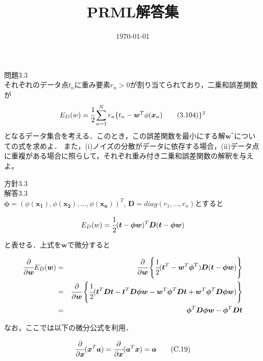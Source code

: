 \documentclass{jsarticle}
\title{PRML解答集}
\date{\today}
\begin{document}
\maketitle

問題3.3 \\
それぞれのデータ点$t_n$に重み要素$r_n > 0$が割り当てられており，二乗和誤差関数が
\begin{equation}
    E_D(w) = \cfrac{1}{2} \sum_{n=1}^{N}r_n \{t_n - \boldsymbol{w}^T \phi (\boldsymbol{x}_n) \tag{3.104} \}^2
\end{equation}
となるデータ集合を考える．このとき，この誤差関数を最小にする解$\boldsymbol{w}^{*}$についての式を求めよ．
また，(i)ノイズの分散がデータに依存する場合，(ii)データ点に重複がある場合に照らして，それぞれ重み付き二乗和誤差関数の解釈を与えよ。

方針3.3 \\

解答3.3 \\

$\boldsymbol{\phi} = (\phi(\boldsymbol{x_1}), \phi(\boldsymbol{x_2}), \ldots, \phi(\boldsymbol{x_n}))^T$, $\boldsymbol{D} = diag(r_1,\ldots,r_n)$とすると

$$ E_D(w) = \cfrac{1}{2} (\boldsymbol{t} - \boldsymbol{\phi}\boldsymbol{w})^T\boldsymbol{D}(\boldsymbol{t} - \boldsymbol{\phi}\boldsymbol{w}) $$

と表せる．上式を$\boldsymbol{w}$で微分すると

\begin{eqnarray*}
    \cfrac{\partial}{\partial \boldsymbol{w}} E_D(\boldsymbol{w})
    &=& \cfrac{\partial}{\partial \boldsymbol{w}} \left\{ \cfrac{1}{2} (\boldsymbol{t}^T - \boldsymbol{w}^T \boldsymbol{\phi}^T)\boldsymbol{D}
    (\boldsymbol{t} - \boldsymbol{\phi}\boldsymbol{w} )  \right\} \\
    &=& \cfrac{\partial}{\partial \boldsymbol{w}} \left\{ \cfrac{1}{2} ( \boldsymbol{t}^T \boldsymbol{D}\boldsymbol{t}
    - \boldsymbol{t}^T \boldsymbol{D} \boldsymbol{\phi} \boldsymbol{w}
    - \boldsymbol{w}^T \boldsymbol{\phi}^T \boldsymbol{D} \boldsymbol{t}
    + \boldsymbol{w}^T \boldsymbol{\phi}^T \boldsymbol{D} \boldsymbol{\phi} \boldsymbol{w}) \right\} \\
    &=& \boldsymbol{\phi}^T \boldsymbol{D} \boldsymbol{\phi} \boldsymbol{w} - \boldsymbol{\phi}^T \boldsymbol{D} \boldsymbol{t}
\end{eqnarray*}

なお，ここでは以下の微分公式を利用．

\begin{equation}
    \cfrac{\partial}{\partial \boldsymbol{x}} (\boldsymbol{x}^T \boldsymbol{a})
    = \cfrac{\partial}{\partial \boldsymbol{x}} (\boldsymbol{a}^T \boldsymbol{x})
    = \boldsymbol{a} \tag{C.19}
\end{equation}
\end{document}
